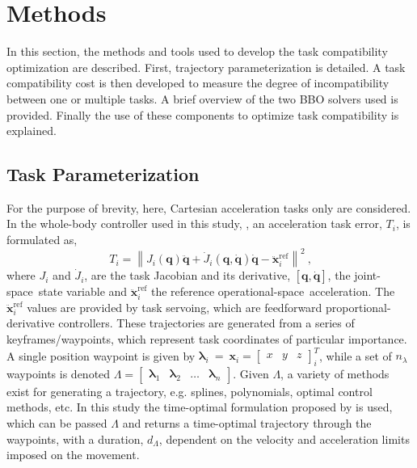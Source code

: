 \documentclass[12pt,a4paper,twoside]{article}
\newcommand{\bs}[1]{\boldsymbol{#1}}
\newcommand{\q}{\bs{q}}
\newcommand{\qd}{\dot{\bs{q}}}
\newcommand{\qdd}{\ddot{\bs{q}}}
\newcommand{\x}{\bs{x}}
\newcommand{\xdd}{\ddot{\bs{x}}}
\newcommand{\os}{operational-space}
\newcommand{\js}{joint-space}
\newcommand{\blam}{\bs{\lambda}}
\newcommand{\tc}{\ \text{,}}
\begin{document}
\section{Methods}
\label{sec:methods}
In this section, the methods and tools used to develop the task compatibility optimization are described. First, trajectory parameterization is detailed. A task compatibility cost is then developed to measure the degree of incompatibility between one or multiple tasks. A brief overview of the two BBO solvers used is provided. Finally the use of these components to optimize task compatibility is explained.

\subsection{Task Parameterization}
\label{sec:task_parameterization}

    For the purpose of brevity, here,  Cartesian acceleration tasks only are considered. In the whole-body controller used in this study, \cite{Salini2011}, an acceleration task error, $T_i$, is formulated as,
    \begin{equation}
         T_{i} = \left\| J_{i}(\q)\qdd + \dot{J}_{i}(\q, \qd)\qd - \xdd^{\text{ref}}_{i} \right\|^2 \tc
        \label{eq:acceleration_task_error}
    \end{equation}
    where $J_{i}$ and $\dot{J}_{i}$, are the task Jacobian and its derivative, $[\q, \qd]$, the \js\ state variable and $\xdd^{\text{ref}}_{i}$ the reference \os\ acceleration. The $\xdd^{\text{ref}}_{i}$ values are provided by task servoing, which are feedforward proportional-derivative controllers. These trajectories are generated from a series of keyframes/waypoints, which represent task coordinates of particular importance. A single position waypoint is given by $\blam_i~=~\x_{i} = \begin{bmatrix} x & y & z \end{bmatrix}^T_i$,
    while a set of $n_{\lambda}$ waypoints is denoted
%
$\Lambda = \begin{bmatrix} \blam_1 & \blam_2 & \dots & \blam_{n} \end{bmatrix}$. Given $\Lambda$, a variety of methods exist for generating a trajectory, e.g. splines, polynomials, optimal control methods, etc. In this study  the time-optimal formulation proposed by \cite{Kunz2012} is used, which can be passed $\Lambda$ and returns a time-optimal trajectory through the waypoints, with a duration, $d_{\Lambda}$, dependent on the velocity and acceleration limits imposed on the movement.
\end{document}
